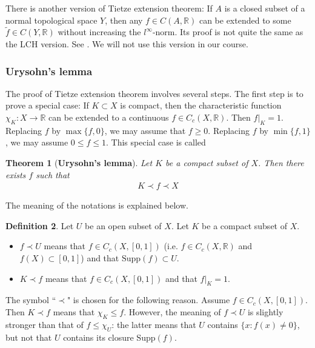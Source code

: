 \documentclass[12pt,b5paper,notitlepage]{article}
\theoremstyle{definition}
\newtheorem{df}{Definition}[section]
\theoremstyle{plain}
\newtheorem{thm}[df]{Theorem}
\newcommand{\wtd}{\widetilde}
\newcommand{\Rbb}{\mathbb R}
\newcommand{\Supp}{\mathrm{Supp}}
\numberwithin{equation}{section}
\begin{document}
There is another version of Tietze extension theorem: If $A$ is a closed subset of a normal topological space $Y$, then any $f\in C(A,\Rbb)$ can be extended to some $\wtd f\in C(Y,\Rbb)$ without increasing the  $l^\infty$-norm. Its proof is not quite the same as the LCH version. See \cite[Sec. 35]{Mun}. We will not use this version in our course. 



\subsubsection{Urysohn's lemma}



The proof of Tietze extension theorem involves several steps. The first step is to prove a special case: If $K\subset X$ is compact, then the characteristic function $\chi_K:X\rightarrow\Rbb$ can be extended to a continuous $f\in C_c(X,\Rbb)$. Then $f|_K=1$. Replacing $f$ by $\max\{f,0\}$, we may assume that $f\geq0$. Replacing $f$ by $\min\{f,1\}$, we may assume $0\leq f\leq 1$. This special case is called


\begin{thm}[\textbf{Urysohn's lemma}]
Let $K$ be a compact subset of $X$. Then there exists $f$ such that   
\begin{align}
K\prec f\prec X
\end{align}
\end{thm}

The meaning of the notations is explained below.

\begin{df}\label{lb465}
Let $U$ be an open subset of $X$. Let $K$ be a compact subset of $X$.
\begin{itemize}
\item $f\prec U$ means that $f\in C_c(X,[0,1])$  (i.e. $f\in C_c(X,\Rbb)$ and $f(X)\subset[0,1]$) and that $\Supp(f)\subset U$.
\item $K\prec f$ means that $f\in C_c(X,[0,1])$ and that $f|_K=1$.
\end{itemize} 
\end{df}
 

The symbol ``$\prec$" is chosen for the following reason. Assume $f\in C_c(X,[0,1])$. Then $K\prec f$ means that $\chi_K\leq f$. However, the meaning of $f\prec U$ is slightly stronger than that of $f\leq \chi_U$: the latter means that $U$ contains $\{x:f(x)\neq0\}$, but not that $U$ contains its closure $\Supp(f)$.
\end{document}
